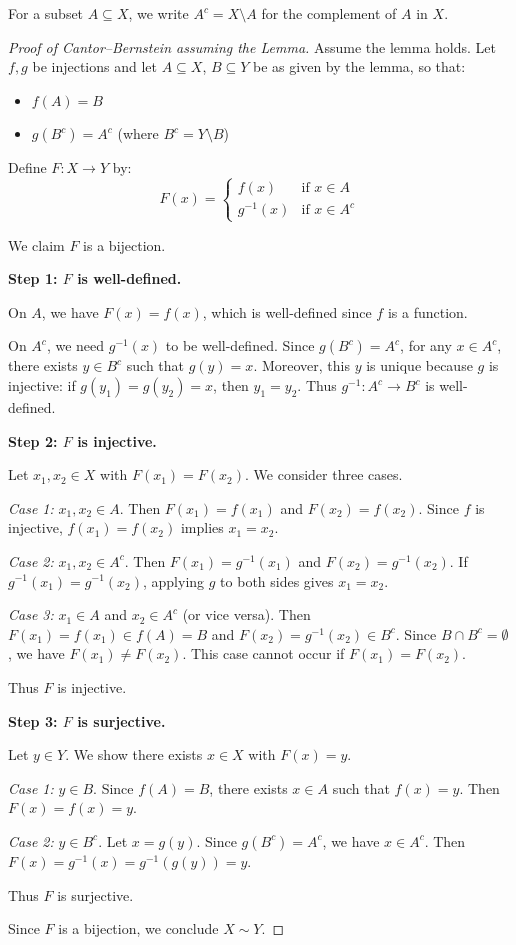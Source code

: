\documentclass[11pt]{report}
\begin{document}
\begin{notebox}[Notation]
For a subset $A \subseteq X$, we write $A^c = X \setminus A$ for the complement of $A$ in $X$.
\end{notebox}

\begin{proof}[Proof of Cantor--Bernstein assuming the Lemma]
Assume the lemma holds. Let $f, g$ be injections and let $A \subseteq X$, $B \subseteq Y$ be as given by the lemma, so that:
\begin{itemize}
    \item $f(A) = B$
    \item $g(B^c) = A^c$ \quad (where $B^c = Y \setminus B$)
\end{itemize}

Define $F: X \to Y$ by:
\[
F(x) = \begin{cases}
f(x) & \text{if } x \in A \\
g^{-1}(x) & \text{if } x \in A^c
\end{cases}
\]

We claim $F$ is a bijection.

\textbf{Step 1: $F$ is well-defined.}

On $A$, we have $F(x) = f(x)$, which is well-defined since $f$ is a function.

On $A^c$, we need $g^{-1}(x)$ to be well-defined. Since $g(B^c) = A^c$, for any $x \in A^c$, there exists $y \in B^c$ such that $g(y) = x$. Moreover, this $y$ is unique because $g$ is injective: if $g(y_1) = g(y_2) = x$, then $y_1 = y_2$. Thus $g^{-1}: A^c \to B^c$ is well-defined.

\textbf{Step 2: $F$ is injective.}

Let $x_1, x_2 \in X$ with $F(x_1) = F(x_2)$. We consider three cases.

\textit{Case 1:} $x_1, x_2 \in A$. Then $F(x_1) = f(x_1)$ and $F(x_2) = f(x_2)$. Since $f$ is injective, $f(x_1) = f(x_2)$ implies $x_1 = x_2$.

\textit{Case 2:} $x_1, x_2 \in A^c$. Then $F(x_1) = g^{-1}(x_1)$ and $F(x_2) = g^{-1}(x_2)$. If $g^{-1}(x_1) = g^{-1}(x_2)$, applying $g$ to both sides gives $x_1 = x_2$.

\textit{Case 3:} $x_1 \in A$ and $x_2 \in A^c$ (or vice versa). Then $F(x_1) = f(x_1) \in f(A) = B$ and $F(x_2) = g^{-1}(x_2) \in B^c$. Since $B \cap B^c = \emptyset$, we have $F(x_1) \neq F(x_2)$. This case cannot occur if $F(x_1) = F(x_2)$.

Thus $F$ is injective.

\textbf{Step 3: $F$ is surjective.}

Let $y \in Y$. We show there exists $x \in X$ with $F(x) = y$.

\textit{Case 1:} $y \in B$. Since $f(A) = B$, there exists $x \in A$ such that $f(x) = y$. Then $F(x) = f(x) = y$.

\textit{Case 2:} $y \in B^c$. Let $x = g(y)$. Since $g(B^c) = A^c$, we have $x \in A^c$. Then $F(x) = g^{-1}(x) = g^{-1}(g(y)) = y$.

Thus $F$ is surjective.

Since $F$ is a bijection, we conclude $X \sim Y$.
\end{proof}
\end{document}

